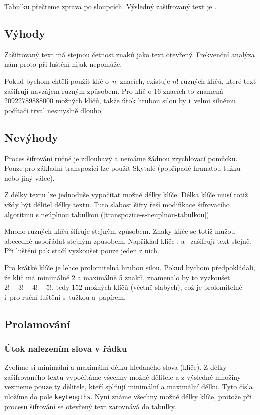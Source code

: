 \documentclass[glossaries, index]{kidiplom}
\begin{document}
Tabulku přečteme zprava po sloupcích. Výsledný zašifrovaný text je .

\subsection{Výhody}
Zašifrovaný text má stejnou četnost znaků jako text otevřený. Frekvenční analýza nám proto při luštění nijak nepomůže.

Pokud bychom chtěli použít klíč o~$n$~znacích, existuje $n!$ různých klíčů, které text zašifrují navzájem různým způsobem. Pro klíč o 16 znacích to znamená 20922789888000 možných klíčů, takže útok hrubou silou by i~velmi silnému počítači trval nesmyslně dlouho.

\subsection{Nevýhody}
Proces šifrování ručně je zdlouhavý a nemáme žádnou zrychlovací pomůcku. Pouze pro základní transpozici lze použít Skytalé (popřípadě hranatou tužku nebo jiný válec).

Z délky textu lze jednoduše vypočítat možné délky klíče. Délka klíče musí totiž vždy být dělitel délky textu. Tuto slabost šifry řeší modifikace šifrovacího algoritmu s neúplnou tabulkou (\ref{transpozice-s-neuplnou-tabulkou}).

Mnoho různých klíčů šifruje stejným způsobem. Znaky klíče se totiž můžou abecedně uspořádat stejným způsobem. Například klíče ,  a~ zašifrují text stejně. Při luštění pak stačí vyzkoušet pouze jeden z nich.

Pro krátké klíče je lehce prolomitelná hrubou silou. Pokud bychom předpokládali, že klíč má minimálně 2 a maximálně 5 znaků, znamenalo by to vyzkoušet $2! + 3! + 4! + 5!$, tedy $152$ možných klíčů (včetně slabých), což je prolomitelné i~pro ruční luštění s~tužkou a~papírem.




\subsection{Prolamování}
\subsubsection{Útok nalezením slova v řádku}
Zvolíme si minimální a maximální délku hledaného slova (klíče). Z délky zašifrovaného textu vypočítáme všechny možné dělitele a z výsledné množiny vezmeme pouze ty dělitele, kteří splňují minimální a maximální délku. Tyto čísla uložíme do pole \texttt{keyLengths}. Nyní známe všechny možné délky klíče, protože při procesu šifrování se otevřený text zarovnává do tabulky. 
\end{document}
